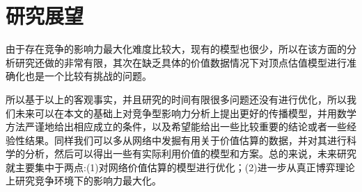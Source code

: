 \section{研究展望}
由于存在竞争的影响力最大化难度比较大，现有的模型也很少，所以在该方面的分析研究还做的非常有限，其次在缺乏具体的价值数据情况下对顶点估值模型进行准确化也是一个比较有挑战的问题。

所以基于以上的客观事实，并且研究的时间有限很多问题还没有进行优化，所以我们未来可以在本文的基础上对竞争型影响力分析上提出更好的传播模型，并用数学方法严谨地给出相应成立的条件，以及希望能给出一些比较重要的结论或者一些经验性结果。同样我们可以多从网络中发掘有用关于价值估算的数据，并对其进行科学的分析，然后可以得出一些有实际利用价值的模型和方案。总的来说，未来研究就主要集中于两点:(1)对网络价值估算的模型进行优化；(2)进一步从真正博弈理论上研究竞争环境下的影响力最大化。